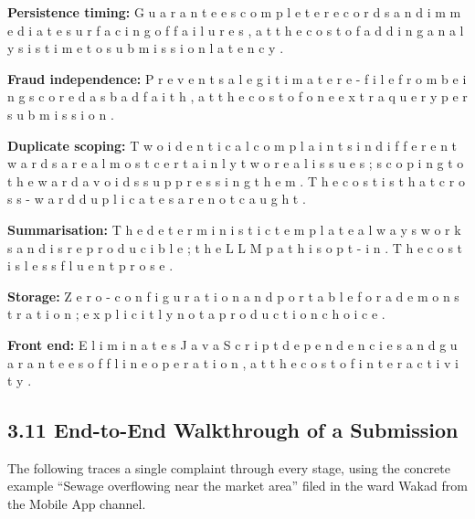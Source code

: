 \documentclass[10pt,letterpaper,oneside]{article}\usepackage{geometry}\geometry{top=1in,bottom=1in,left=1in,right=1in,includeheadfoot}\usepackage{xcolor}\definecolor{color@navy}{HTML}{1F3B63}\definecolor{color@grey}{HTML}{404040}\definecolor{color@hdr}{HTML}{F2F4F7}\usepackage{titlesec}\titleformat{\section}  {\normalfont\huge\bfseries\color@navy}  {}{0pt}{\MakeUppercase}\titleformat{\subsection}  {\normalfont\Large\bfseries\color@navy}  {}{0pt}{}\titleformat{\subsubsection}  {\normalfont\large\bfseries\color@navy}  {}{0pt}{}\titlespacing*{\section}{0pt}{14pt}{6pt}\titlespacing*{\subsection}{0pt}{10pt}{4pt}\titlespacing*{\subsubsection}{0pt}{8pt}{3pt}\setlength{\parindent}{0pt}\setlength{\parskip}{0.6em}\parindent=0pt\usepackage{enumitem}\setlist{nosep,leftmargin=*,itemsep=0pt,topsep=2pt,partopsep=0pt}\usepackage{array}\usepackage{booktabs}\usepackage{caption}\captionsetup{font={small,it},labelfont={bf},labelsep=period,  parskip=2pt,skip=4pt,list=no}\captionsetup[table]{labelfont={bf,small,color@navy},name=Table}\usepackage{graphicx}\usepackage{verbatim}\usepackage{ragged2e}\usepackage{longtable}\usepackage{tabularx}\usepackage{multirow}\usepackage{colortbl}\definecolor{rowshade}{HTML}{F2F4F7}\usepackage{tikz}\usetikzlibrary{positioning,calc}\usepackage[hidelinks]{hyperref}\hypersetup{colorlinks=true,linkcolor=color@navy,urlcolor=color@navy}\pagestyle{fancy}\fancyhf{}\renewcommand{\headrulewidth}{0.4pt}\fancyhead[L]{\small\color@navy CivicSense — Project Report}\fancyhead[R]{\small\color@grey October 11, 2026}\fancyfoot[C]{\small\color@grey An Integrated Intelligent Triage Pipelin}\fancyfoot[R]{\small\color@grey Page \thepage}\usepackage{setspace}\setstretch{1.15}\AtBeginDocument{  \hypersetup{pdftitle={An Integrated Intelligent Triage Pipeline for AI-Enhanced Citizen Complaint Management},    pdfauthor={CivicSense Project Team},    pdfsubject={Project Report},    pdfkeywords={smart cities, NLP, complaint management, e-governance},    pdfcreator={CivicSense Project Team}  }}
\begin{document}
\item \textbf{Persistence timing: } G u a r a n t e e s   c o m p l e t e   r e c o r d s   a n d   i m m e d i a t e   s u r f a c i n g   o f   f a i l u r e s ,   a t   t h e   c o s t   o f   a d d i n g   a n a l y s i s   t i m e   t o   s u b m i s s i o n   l a t e n c y .

\item \textbf{Fraud independence: } P r e v e n t s   a   l e g i t i m a t e   r e - f i l e   f r o m   b e i n g   s c o r e d   a s   b a d   f a i t h ,   a t   t h e   c o s t   o f   o n e   e x t r a   q u e r y   p e r   s u b m i s s i o n .

\item \textbf{Duplicate scoping: } T w o   i d e n t i c a l   c o m p l a i n t s   i n   d i f f e r e n t   w a r d s   a r e   a l m o s t   c e r t a i n l y   t w o   r e a l   i s s u e s ;   s c o p i n g   t o   t h e   w a r d   a v o i d s   s u p p r e s s i n g   t h e m .   T h e   c o s t   i s   t h a t   c r o s s - w a r d   d u p l i c a t e s   a r e   n o t   c a u g h t .

\item \textbf{Summarisation: } T h e   d e t e r m i n i s t i c   t e m p l a t e   a l w a y s   w o r k s   a n d   i s   r e p r o d u c i b l e ;   t h e   L L M   p a t h   i s   o p t - i n .   T h e   c o s t   i s   l e s s   f l u e n t   p r o s e .

\item \textbf{Storage: } Z e r o - c o n f i g u r a t i o n   a n d   p o r t a b l e   f o r   a   d e m o n s t r a t i o n ;   e x p l i c i t l y   n o t   a   p r o d u c t i o n   c h o i c e .

\item \textbf{Front end: } E l i m i n a t e s   J a v a S c r i p t   d e p e n d e n c i e s   a n d   g u a r a n t e e s   o f f l i n e   o p e r a t i o n ,   a t   t h e   c o s t   o f   i n t e r a c t i v i t y .

\subsection*{3.11 End-to-End Walkthrough of a Submission}
The following traces a single complaint through every stage, using the concrete example “Sewage overflowing near the market area” filed in the ward Wakad from the Mobile App channel.
\end{document}
